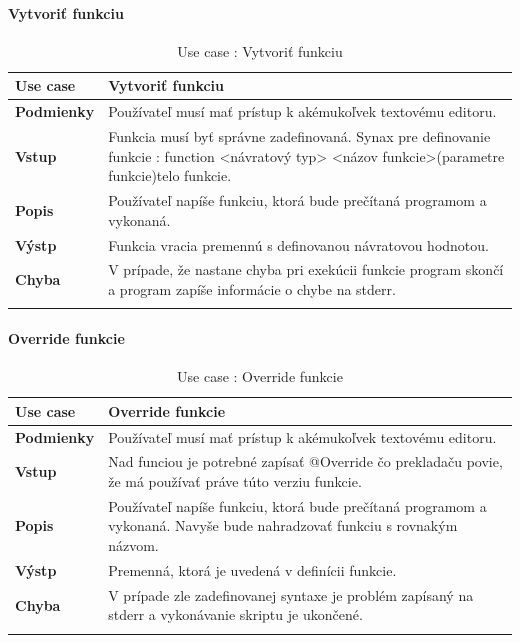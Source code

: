 \paragraph{Vytvoriť funkciu}
\begin{center}
	\begin{longtable}{|p{2.5cm}|p{14cm}|}
		
			\hline
			\textbf{Use case} & Vytvoriť funkciu \\ 
			\hline
			\textbf{Podmienky} & Používateľ musí mať prístup k akémukoľvek textovému editoru.  \\ 
			\hline
			\textbf{Vstup} & Funkcia musí byť správne zadefinovaná. 
			Synax pre definovanie funkcie : 
			\newline
			function <návratový typ> <názov funkcie>(parametre funkcie){telo funkcie}. \\
			\hline
			
			\textbf{Popis} & Používateľ napíše funkciu, ktorá bude prečítaná programom a vykonaná.\\ 
			\hline

			\textbf{Výstp} & Funkcia vracia premennú s definovanou návratovou hodnotou.\\
			\hline
			\textbf{Chyba} & V prípade, že nastane chyba pri exekúcii funkcie program skončí a program zapíše informácie o chybe na stderr.\\
			\hline
		\caption{Use case : Vytvoriť funkciu}
		\label{table:1}
		
	\end{longtable}
\end{center}
\paragraph{Override funkcie}
\begin{center}
	\begin{longtable}{|p{2.5cm}|p{14cm}|}
		
			\hline
			\textbf{Use case} & Override funkcie \\ 
			\hline
			\textbf{Podmienky} & Používateľ musí mať prístup k akémukoľvek textovému editoru.  \\ 
			\hline
			\textbf{Vstup} & Nad funciou je potrebné zapísať @Override  čo prekladaču povie, že má používať práve túto verziu funkcie.\\
			\hline
			
			\textbf{Popis} & Používateľ napíše funkciu, ktorá bude prečítaná programom a vykonaná. Navyše bude nahradzovať funkciu s rovnakým názvom.\\ 
			\hline
			\textbf{Výstp} & Premenná, ktorá je uvedená v definícii funkcie.\\
			\hline
			\textbf{Chyba} & V prípade zle zadefinovanej syntaxe je problém zapísaný na stderr a vykonávanie skriptu je ukončené.\\
			\hline
		\caption{Use case : Override funkcie}
		\label{table:1}
		
	\end{longtable}
\end{center}
